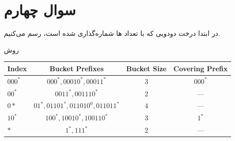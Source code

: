 \documentclass[paper=a4, fontsize=11pt]{article}
\numberwithin{equation}{section} %
\numberwithin{figure}{section} %
\numberwithin{table}{section} %
\begin{document}
\section{سوال چهارم}
\par
در ابتدا درخت دودویی که با تعداد ها شماره‌گذاری شده است، رسم می‌کنیم.


\begin{center}
\end{center}

\par
روش 

\begin{center}
\begin{latin}
\begin{tabular}{ l  c  c  c }
    \hline
    Index & Bucket Prefixes & Bucket Size & Covering Prefix \\
    \hline
    $000^*$ & $000^*, 00010^*, 00011^*$ & 3 & $000^*$ \\
    $00^*$ & $0011^*, 001110^*$ & 2 & --- \\
    $0*$ & $01^*, 01101^*, 011010^0, 011011^*$ & 4 & --- \\
    $10^*$ & $100^*, 10010^*, 100110^*$ & 3 & $1^*$ \\ 
    $*$ & $1^*, 111^*$ & 2 & --- \\
    \hline
\end{tabular}
\end{latin}
\end{center}
\end{document}
